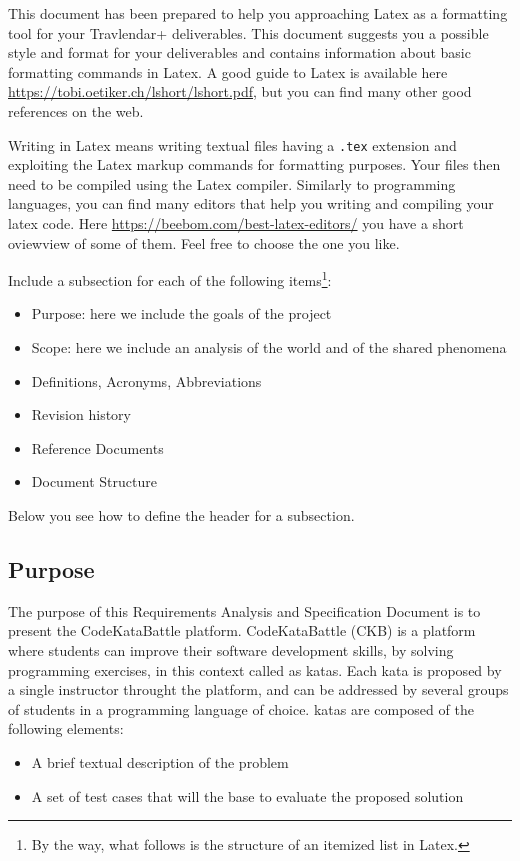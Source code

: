 This document has been prepared to help you approaching Latex as a formatting tool for your Travlendar+ deliverables. This document suggests you a possible style and format for your deliverables and contains information about basic formatting commands in Latex. A good guide to Latex is available here \href{https://tobi.oetiker.ch/lshort/lshort.pdf}{https://tobi.oetiker.ch/lshort/lshort.pdf}, but you can find many other good references on the web. 

Writing in Latex means writing textual files having a \texttt{.tex} extension and exploiting the Latex markup commands for formatting purposes. Your files then need to be compiled using the Latex compiler. Similarly to programming languages, you can find many editors that help you writing and compiling your latex code. Here \href{https://beebom.com/best-latex-editors/}{https://beebom.com/best-latex-editors/} you have a short oviewview of some of them. Feel free to choose the one you like.  

Include a subsection for each of the following items\footnote{By the way, what follows is the structure of an itemized list in Latex.}:
\begin{itemize}
\item
Purpose: here we include the goals of the project
\item
Scope: here we include an analysis of the world and of the shared phenomena
\item
Definitions, Acronyms, Abbreviations
\item
Revision history
\item
Reference Documents 
\item
Document Structure
\end{itemize}
Below you see how to define the header for a subsection.
\subsection{Purpose}
The purpose of this Requirements Analysis and Specification Document is to present the CodeKataBattle platform. CodeKataBattle (CKB) is a platform where students can improve their software development skills, by solving programming exercises, in this context called as katas.
Each kata is proposed by a single instructor throught the platform, and can be addressed by several groups of students in a programming language of choice.
katas are composed of the following elements:
\begin{itemize}
    \item A brief textual description of the problem
    \item A set of test cases that will the base to evaluate the proposed solution
\end{itemize}

